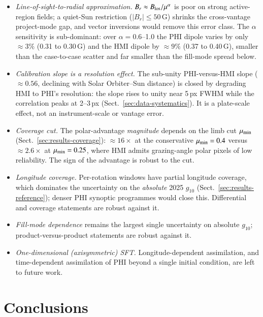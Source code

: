 \documentclass{aa}
\begin{document}
\begin{itemize}
    \item \emph{Line-of-sight-to-radial approximation.} $B_r \approx B_{\rm los}/\mu^{\alpha}$ is poor on strong active-region fields; a quiet-Sun restriction ($|B_r| \le 50$\,G) shrinks the cross-vantage project-mode gap, and vector inversions would remove this error class. The $\alpha$ sensitivity is sub-dominant: over $\alpha = 0.6$--1.0 the PHI dipole varies by only $\approx 3\%$ (0.31 to 0.30\,G) and the HMI dipole by $\approx 9\%$ (0.37 to 0.40\,G), smaller than the case-to-case scatter and far smaller than the fill-mode spread below.
    \item \emph{Calibration slope is a resolution effect.} The sub-unity PHI-versus-HMI slope ($\approx 0.56$, declining with Solar Orbiter--Sun distance) is closed by degrading HMI to PHI's resolution: the slope rises to unity near 5\,px FWHM while the correlation peaks at 2--3\,px (Sect.~\ref{sec:data-systematics}). It is a plate-scale effect, not an instrument-scale or vantage error.
    \item \emph{Coverage cut.} The polar-advantage \emph{magnitude} depends on the limb cut $\mu_{\rm min}$ (Sect.~\ref{sec:results-coverage}): $\approx 16\times$ at the conservative $\mu_{\rm min} = 0.4$ versus $\approx 2.6\times$ at $\mu_{\rm min} = 0.25$, where HMI admits grazing-angle polar pixels of low reliability. The sign of the advantage is robust to the cut.
    \item \emph{Longitude coverage.} Per-rotation windows have partial longitude coverage, which dominates the uncertainty on the \emph{absolute} 2025 $g_{10}$ (Sect.~\ref{sec:results-reference}); denser PHI synoptic programmes would close this. Differential and coverage statements are robust against it.
    \item \emph{Fill-mode dependence} remains the largest single uncertainty on absolute $g_{10}$; product-versus-product statements are robust against it.
    \item \emph{One-dimensional (axisymmetric) SFT.} Longitude-dependent assimilation, and time-dependent assimilation of PHI beyond a single initial condition, are left to future work.
\end{itemize}

\section{Conclusions}
\label{sec:conclusions}
\end{document}
